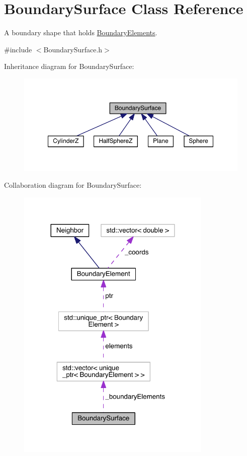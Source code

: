 \hypertarget{classBoundarySurface}{\section{Boundary\+Surface Class Reference}
\label{classBoundarySurface}
}


A boundary shape that holds \hyperlink{classBoundaryElement}{Boundary\+Elements}.  




{\ttfamily \#include $<$Boundary\+Surface.\+h$>$}



Inheritance diagram for Boundary\+Surface\+:\nopagebreak
\begin{figure}[H]
\begin{center}
\leavevmode
\includegraphics[width=350pt]{classBoundarySurface__inherit__graph}
\end{center}
\end{figure}


Collaboration diagram for Boundary\+Surface\+:
\nopagebreak
\begin{figure}[H]
\begin{center}
\leavevmode
\includegraphics[width=264pt]{classBoundarySurface__coll__graph}
\end{center}
\end{figure}
